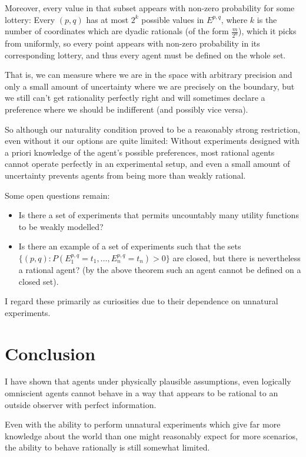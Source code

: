 \documentclass[a4paper]{book}
\begin{document}
Moreover, every value in that subset appears with non-zero probability for some
lottery: Every $(p, q)$
has at most $2^k$
possible values in $E^{p, q}$,
where $k$
is the number of coordinates which are dyadic rationals (of the form $\frac{m}{2^n}$),
which it picks from uniformly, so every point appears with non-zero probability
in its corresponding lottery, and thus every agent must be defined on the whole
set.

That is, we can measure where we are in the space with arbitrary precision and only
a small amount of uncertainty where we are precisely on the boundary, but we
still can't get rationality perfectly right and will sometimes declare a preference
where we should be indifferent (and possibly vice versa).

So although our naturality condition proved to be a reasonably strong restriction,
even without it our options are quite limited: Without experiments designed with
a priori knowledge of the agent's possible preferences, most rational agents
cannot operate perfectly in an experimental setup, and even a small amount of
uncertainty prevents agents from being more than weakly rational.

Some open questions remain:

\begin{itemize}
\item Is there a set of experiments that permits uncountably many utility functions
to be weakly modelled?
\item Is there an example of a set of experiments such that the sets
$\{(p, q): P(E^{p, q}_1 = t_1, \ldots, E^{p, q}_n = t_n) > 0\}$
are closed, but there is nevertheless a rational agent? (by the above theorem
such an agent cannot be defined on a closed set).
\end{itemize}

I regard these primarily as curiosities due to their dependence on unnatural experiments. 

\section{Conclusion}

I  have shown that agents under physically plausible assumptions, even logically
omniscient agents cannot behave in a way that appears to be rational to an
outside observer with perfect information.

Even with the ability to perform unnatural experiments which give far more
knowledge about the world than one might reasonably expect for more scenarios,
the ability to behave rationally is still somewhat limited.
\end{document}
